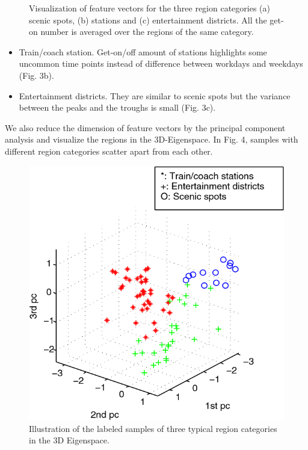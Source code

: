 \documentclass[a4paper, 10pt, conference]{ieeeconf}      %
\begin{document}
\begin{figure}[htbp]
    \caption{Visualization of feature vectors for the three region categories (a) scenic spots, (b) stations and (c) entertainment districts. All the get-on number is averaged over the regions of the same category.}
    \label{fig:my_label_3}
\end{figure}

\begin{itemize}

\item Train/coach station. Get-on/off amount of stations highlights some uncommon time points instead of difference between workdays and weekdays (Fig. 3b).
\item Entertainment districts. They are similar to scenic spots but the variance between the peaks and the troughs is small (Fig. 3c).

\end{itemize}

We also reduce the dimension of feature vectors by the principal component analysis and visualize the regions in the 3D-Eigenspace. In Fig. 4, samples with different region categories scatter apart from each other.

\begin{figure}[thbp]
    \centering
    \includegraphics{fig/f6.png}
    \caption{Illustration of the labeled samples of three typical region categories in the 3D Eigenspace.}
    \label{fig:my_label_4}
\end{figure}
\end{document}
